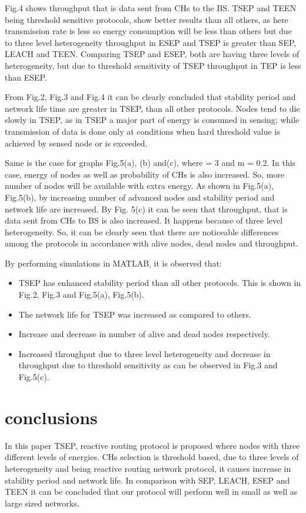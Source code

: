 \documentclass[conference]{IEEEtran}
\begin{document}
Fig.4 shows throughput that is data sent from CHs to the BS. TSEP and TEEN being threshold sensitive protocols, show better results than all others, as here transmission rate is less so energy consumption will be less than others but due to three level heterogeneity throughput in ESEP and TSEP is greater than SEP, LEACH and TEEN. Comparing TSEP and ESEP, both are having three levels of heterogeneity, but due to threshold sensitivity of TSEP throughput in TEP is less than ESEP.

From Fig.2, Fig.3 and Fig.4 it can be clearly concluded that stability period and network life time are greater in TSEP, than all other protocols. Nodes tend to die slowly in TSEP, as in TSEP a major part of energy is consumed in sensing; while transmission of data is done only at conditions when hard threshold value is achieved by sensed node or is exceeded.

Same is the case for graphs Fig.5(a), (b) and(c), where  = 3 and m = 0.2. In this case, energy of nodes as well as probability of CHs is also increased. So, more number of nodes will be available with extra energy. As shown in Fig.5(a), Fig.5(b), by increasing number of advanced nodes and  stability period and network life are increased.
By Fig. 5(c) it can be seen that throughput, that is data sent from CHs to BS is also increased. It happens because of three level heterogeneity. So, it can be clearly seen that there are noticeable differences among the protocols in accordance with alive nodes, dead nodes and throughput.

By performing simulations in MATLAB, it is observed that:\\
\begin{itemize}
  \item TSEP has enhanced stability period than all other protocols. This is shown in Fig.2, Fig.3 and Fig.5(a), Fig.5(b).
  \item	The network life for TSEP was increased as compared to others.
  \item Increase and decrease in number of alive and dead nodes respectively.
  \item Increased throughput due to three level heterogeneity and decrease in throughput due to threshold sensitivity as can be observed in Fig.3 and Fig.5(c).\\
\end{itemize}
	
\section{conclusions}
In this paper TSEP, reactive routing protocol is proposed where nodes with three different levels of energies. CHs selection is threshold based, due to three levels of heterogeneity and being reactive routing network protocol, it causes increase in stability period and network life. In comparison with SEP, LEACH, ESEP and TEEN it can be concluded that our protocol will perform well in small as well as large sized networks.
\end{document}
